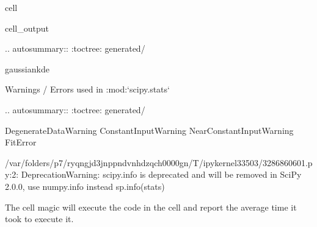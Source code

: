 \documentclass[letterpaper,10pt,english]{jupyterBook}
\begin{document}
\begin{sphinxuseclass}{cell}
\begin{sphinxVerbatimOutput}
\begin{sphinxuseclass}{cell_output}
\begin{sphinxVerbatim}[commandchars=\\\{\}]
.. autosummary::
   :toctree: generated/

   gaussian\PYGZus{}kde

Warnings / Errors used in :mod:`scipy.stats`
\PYGZhy{}\PYGZhy{}\PYGZhy{}\PYGZhy{}\PYGZhy{}\PYGZhy{}\PYGZhy{}\PYGZhy{}\PYGZhy{}\PYGZhy{}\PYGZhy{}\PYGZhy{}\PYGZhy{}\PYGZhy{}\PYGZhy{}\PYGZhy{}\PYGZhy{}\PYGZhy{}\PYGZhy{}\PYGZhy{}\PYGZhy{}\PYGZhy{}\PYGZhy{}\PYGZhy{}\PYGZhy{}\PYGZhy{}\PYGZhy{}\PYGZhy{}\PYGZhy{}\PYGZhy{}\PYGZhy{}\PYGZhy{}\PYGZhy{}\PYGZhy{}\PYGZhy{}\PYGZhy{}\PYGZhy{}\PYGZhy{}\PYGZhy{}\PYGZhy{}\PYGZhy{}\PYGZhy{}\PYGZhy{}\PYGZhy{}

.. autosummary::
   :toctree: generated/

   DegenerateDataWarning
   ConstantInputWarning
   NearConstantInputWarning
   FitError
\end{sphinxVerbatim}

\begin{sphinxVerbatim}[commandchars=\\\{\}]
/var/folders/p7/\PYGZus{}ryqngjd3jn\PYGZus{}ppndvnhdzqch0000gn/T/ipykernel\PYGZus{}33503/3286860601.py:2: DeprecationWarning: scipy.info is deprecated and will be removed in SciPy 2.0.0, use numpy.info instead
  sp.info(stats)
\end{sphinxVerbatim}

\end{sphinxuseclass}\end{sphinxVerbatimOutput}

\end{sphinxuseclass}
\begin{DUlineblock}{0em}
\item[] 
\end{DUlineblock}

\sphinxAtStartPar
The  cell magic will execute the code in the cell and report the average time it took to execute it.
\end{document}
